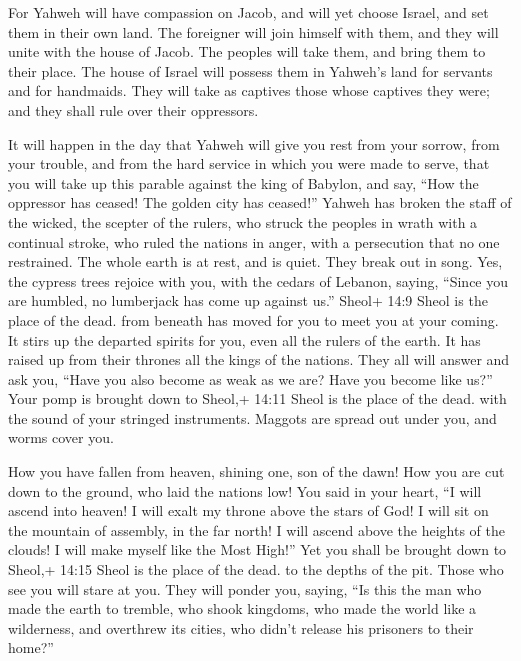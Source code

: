  For Yahweh will have compassion on Jacob, and will yet
choose Israel, and set them in their own land. The foreigner will join
himself with them, and they will unite with the house of Jacob.
 The peoples will take them, and bring them to their place.
The house of Israel will possess them in Yahweh's land for servants and
for handmaids. They will take as captives those whose captives they
were; and they shall rule over their oppressors.

 It will happen in the day that Yahweh will give you rest
from your sorrow, from your trouble, and from the hard service in which
you were made to serve,  that you will take up this parable
against the king of Babylon, and say, ``How the oppressor has ceased!
The golden city has ceased!''  Yahweh has broken the staff
of the wicked, the scepter of the rulers,  who struck the
peoples in wrath with a continual stroke, who ruled the nations in
anger, with a persecution that no one restrained.  The whole
earth is at rest, and is quiet. They break out in song. 
Yes, the cypress trees rejoice with you, with the cedars of Lebanon,
saying, ``Since you are humbled, no lumberjack has come up against us.''
 Sheol+ 14:9 Sheol is the place of the dead. from beneath
has moved for you to meet you at your coming. It stirs up the departed
spirits for you, even all the rulers of the earth. It has raised up from
their thrones all the kings of the nations.  They all will
answer and ask you, ``Have you also become as weak as we are? Have you
become like us?''  Your pomp is brought down to Sheol,+
14:11 Sheol is the place of the dead. with the sound of your stringed
instruments. Maggots are spread out under you, and worms cover you.

 How you have fallen from heaven, shining one, son of the
dawn! How you are cut down to the ground, who laid the nations low!
 You said in your heart, ``I will ascend into heaven! I
will exalt my throne above the stars of God! I will sit on the mountain
of assembly, in the far north!  I will ascend above the
heights of the clouds! I will make myself like the Most High!''
 Yet you shall be brought down to Sheol,+ 14:15 Sheol is
the place of the dead. to the depths of the pit.  Those who
see you will stare at you. They will ponder you, saying, ``Is this the
man who made the earth to tremble, who shook kingdoms,  who
made the world like a wilderness, and overthrew its cities, who didn't
release his prisoners to their home?''

